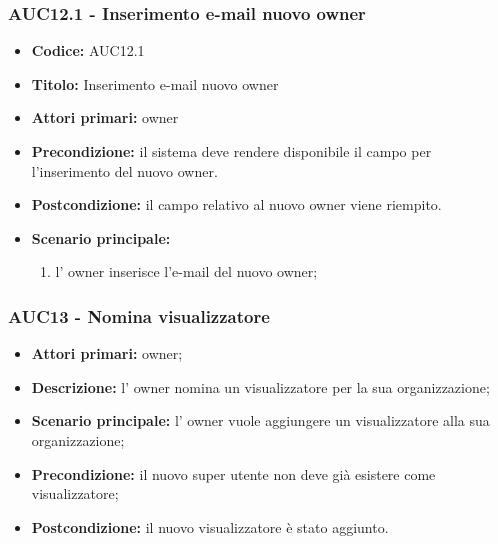 \documentclass[casi-duso]{subfiles}
\begin{document}
\subsubsection{AUC12.1 - Inserimento e-mail nuovo owner}%
\label{subsub:AUC12.1}
\begin{itemize}
  \item \textbf{Codice:} AUC12.1
  \item \textbf{Titolo:} Inserimento e-mail nuovo owner
  \item \textbf{Attori primari:} owner
  \item \textbf{Precondizione:} il sistema deve rendere disponibile il campo per l'inserimento del nuovo owner.
  \item \textbf{Postcondizione:} il campo relativo al nuovo owner viene riempito.
  \item \textbf{Scenario principale:} 
  \begin{enumerate}
    \item l' owner inserisce l'e-mail del nuovo owner;
  \end{enumerate}
\end{itemize}


\subsubsection{AUC13 - Nomina visualizzatore}%
\label{subsub:AUC13}
\begin{itemize}
  \item \textbf{Attori primari:} owner;
  \item \textbf{Descrizione:} l' owner nomina un visualizzatore per la sua organizzazione;
  \item \textbf{Scenario principale:} l' owner vuole aggiungere un visualizzatore alla sua organizzazione;
  \item \textbf{Precondizione:} il nuovo super utente non deve già esistere come visualizzatore;
  \item \textbf{Postcondizione:} il nuovo visualizzatore è stato aggiunto.
\end{itemize}
\end{document}
